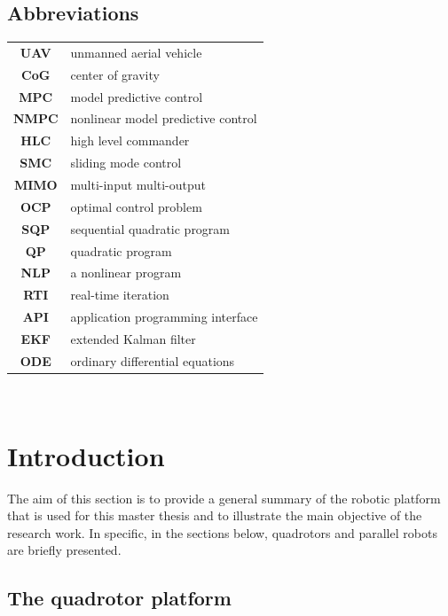 \documentclass{thesisreport}
\begin{document}
  \section*{Abbreviations}
 \begin{tabular}{cp{}}
  \textbf{UAV} & unmanned aerial vehicle \\
  \textbf{CoG} & center of gravity \\
  \textbf{MPC} & model predictive control \\
  \textbf{NMPC} & nonlinear model predictive control \\
  \textbf{HLC} & high level commander \\
  \textbf{SMC} & sliding mode control \\
  \textbf{MIMO} & multi-input multi-output \\
  \textbf{OCP} & optimal control problem \\
  \textbf{SQP} & sequential quadratic program \\
  \textbf{QP} & quadratic program \\
  \textbf{NLP} & a nonlinear program \\
  \textbf{RTI} & real-time iteration \\
  \textbf{API} & application programming interface \\
  \textbf{EKF} & extended Kalman filter \\
  \textbf{ODE} & ordinary differential equations \\
  
  
 \end{tabular}\\
 \newpage
 
 \listoffigures
 
\listoftables
 
 \tableofcontents
 
 
 \chapter*{Introduction}
 The aim of this section is to provide a general summary of the robotic platform that is used for this master thesis and to illustrate the main objective of the research work.
In specific, in the sections below, quadrotors and parallel robots are briefly presented.

 \section*{The quadrotor platform}
\end{document}

